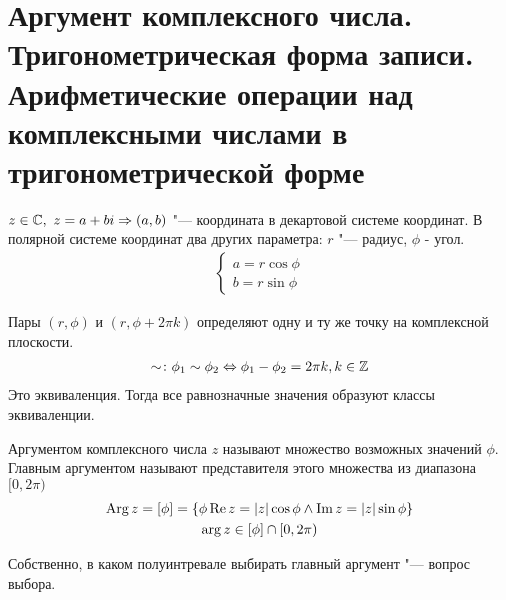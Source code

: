 \section{Аргумент комплексного числа. Тригонометрическая форма записи. Арифметические операции над комплексными числами в тригонометрической форме}

\begin{center}
\def\svgwidth{6.0cm}

\end{center}
$z \in \mathbb{C},~z = a + bi \Rightarrow (a, b)$ "--- координата в декартовой системе координат. В полярной системе координат два других параметра: $r$ "--- радиус, $\phi$ - угол.
\begin{gather*}
\left\{
\begin{aligned}
	a = r\cos \phi  \\
	b = r\sin \phi
\end{aligned}\right.
\end{gather*}

Пары $(r, \phi)$ и $(r, \phi + 2 \pi k)$ определяют одну и ту же точку на комплексной плоскости.
\begin{gather*}
\sim\colon \phi_1 \sim \phi_2 \Leftrightarrow \phi_1 - \phi_2 = 2 \pi k, k\in \mathbb{Z}
\end{gather*}
Это эквиваленция. Тогда все равнозначные значения образуют классы эквиваленции.
\begin{Def}
Аргументом комплексного числа $z$ называют множество возможных значений $\phi$. Главным аргументом называют представителя этого множества из диапазона $[0,2\pi)$
\begin{gather*}
\operatorname{Arg} z = [\phi] = \left\{\phi \mathop{\mathrm{Re}}\nolimits z = |z| \cos \phi \land \mathop{\mathrm{Im}}\nolimits z = |z| \sin \phi\right\}\\
\arg z \in [\phi] \cap [0,2\pi)
\end{gather*}
\end{Def}
\begin{Rem}
Собственно, в каком полуинтревале выбирать главный аргумент "--- вопрос выбора.
\end{Rem}

